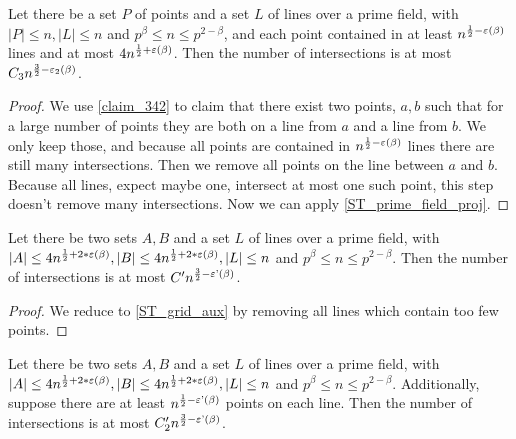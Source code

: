 \begin{theorem}
    \label{ST_prime_field_aux}
    \leanok
    Let there be a set $P$ of points and a set $L$ of lines over a prime field, 
    with $|P| \leq n, |L| \leq n$ and $p^\beta \leq n \leq p^{2 - \beta}$,
    and each point contained in at least $n^{\frac12 - \operatorname{\varepsilon}(\beta)}$ lines
    and at most $4 n^{\frac12 + \operatorname{\varepsilon}(\beta)}$.
    Then the number of intersections is at most $C_3 n^{\frac32 - \operatorname{\varepsilon_2}(\beta)}$.
\end{theorem}

\begin{proof}
    \leanok
    We use \ref{claim_342} to claim that there exist two points, $a, b$ such that for a large number of 
    points they are both on a line from $a$ and a line from $b$.
    We only keep those, and because all points are contained in $n^{\frac12 - \operatorname{\varepsilon}(\beta)}$ lines there are still many intersections.
    Then we remove all points on the line between $a$ and $b$. Because all lines, expect maybe one, intersect at most one such point,
    this step doesn't remove many intersections.
    Now we can apply \ref{ST_prime_field_proj}.
\end{proof}

\begin{theorem}
    \label{ST_grid}
    \leanok
    Let there be two sets $A, B$ and a set $L$ of lines over a prime field, 
    with $|A| \leq 4n^{\frac12 + 2*\operatorname{\varepsilon}(\beta)}, |B| \leq 4n^{\frac12 + 2*\operatorname{\varepsilon}(\beta)}, |L| \leq n$ and $p^\beta \leq n \leq p^{2 - \beta}$.
    Then the number of intersections is at most $C' n^{\frac32 - \operatorname{\varepsilon'}(\beta)}$.
\end{theorem}

\begin{proof}
    \leanok
    We reduce to \ref{ST_grid_aux} by removing all lines which contain too few points.
\end{proof}

\begin{theorem}
    \label{ST_grid_aux}
    \leanok
    Let there be two sets $A, B$ and a set $L$ of lines over a prime field, 
    with $|A| \leq 4n^{\frac12 + 2*\operatorname{\varepsilon}(\beta)}, |B| \leq 4n^{\frac12 + 2*\operatorname{\varepsilon}(\beta)}, |L| \leq n$ and $p^\beta \leq n \leq p^{2 - \beta}$.
    Additionally, suppose there are at least $n^{\frac12 - \operatorname{\varepsilon'}(\beta)}$ points on each line.
    Then the number of intersections is at most $C'_2 n^{\frac32 - \operatorname{\varepsilon'}(\beta)}$.
\end{theorem}

